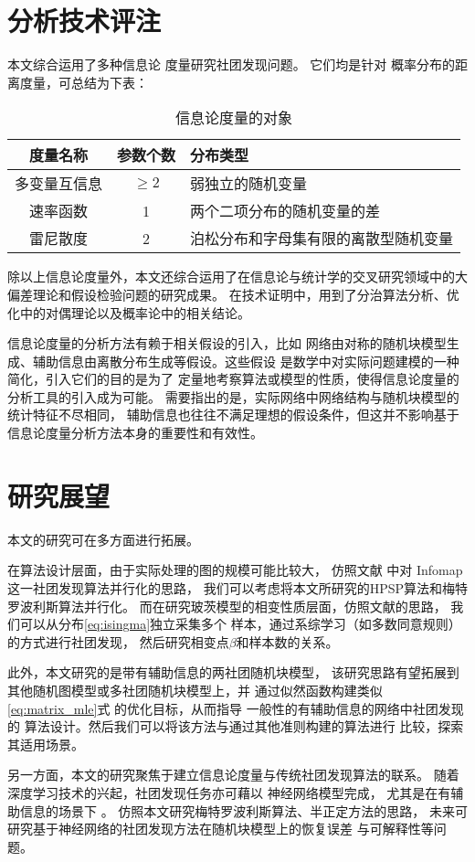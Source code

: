 \section{分析技术评注}
本文综合运用了多种信息论
度量研究社团发现问题。
它们均是针对
概率分布的距离度量，可总结为下表：
\begin{table}[!ht]
    \centering
  \begin{tabular}{ccp{8cm}}
    \hline
     度量名称    &   参数个数 &   分布类型 \\
    \hline
     多变量互信息 &    $\geq 2$ &    弱独立的随机变量  \\
     速率函数     &    1 &     两个二项分布的随机变量的差  \\
     雷尼散度     &    2 &    泊松分布和字母集有限的离散型随机变量 \\
    \hline
  \end{tabular}
  \caption{信息论度量的对象}\label{tab:info_metric}
\end{table}

除以上信息论度量外，本文还综合运用了在信息论与统计学的交叉研究领域中的大偏差理论和假设检验问题的研究成果。
在技术证明中，用到了分治算法分析、优化中的对偶理论以及概率论中的相关结论。

信息论度量的分析方法有赖于相关假设的引入，比如
网络由对称的随机块模型生成、辅助信息由离散分布生成等假设。这些假设
是数学中对实际问题建模的一种简化，引入它们的目的是为了
定量地考察算法或模型的性质，使得信息论度量的分析工具的引入成为可能。
需要指出的是，实际网络中网络结构与随机块模型的统计特征不尽相同，
辅助信息也往往不满足理想的假设条件，但这并不影响基于信息论度量分析方法本身的重要性和有效性。

\section{研究展望}
本文的研究可在多方面进行拓展。

在算法设计层面，由于实际处理的图的规模可能比较大，
仿照文献  中对 Infomap 这一社团发现算法并行化的思路，
我们可以考虑将本文所研究的HPSP算法和梅特罗波利斯算法并行化。
而在研究玻茨模型的相变性质层面，仿照文献的思路，
我们可以从分布\eqref{eq:isingma}独立采集多个
样本，通过系综学习（如多数同意规则）的方式进行社团发现，
然后研究相变点$\beta$和样本数的关系。

此外，本文研究的是带有辅助信息的两社团随机块模型，
该研究思路有望拓展到其他随机图模型或多社团随机块模型上，并
通过似然函数构建类似\eqref{eq:matrix_mle}式
的优化目标，从而指导
一般性的有辅助信息的网络中社团发现的
算法设计。然后我们可以将该方法与通过其他准则\cite{chunaev2020community}构建的算法进行
比较，探索其适用场景。

另一方面，本文的研究聚焦于建立信息论度量与传统社团发现算法的联系。
随着深度学习技术的兴起，社团发现任务亦可藉以
神经网络模型完成\cite{Su_2022}，
尤其是在有辅助信息的场景下 \cite{cao2018incorporating}。
仿照本文研究梅特罗波利斯算法、半正定方法的思路，
未来可研究基于神经网络的社团发现方法在随机块模型上的恢复误差
与可解释性等问题。
